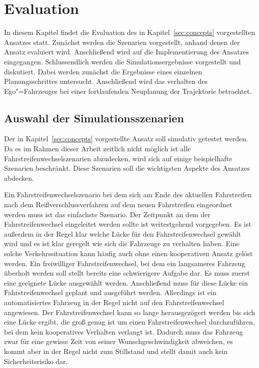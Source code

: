 
\chapter{Evaluation}
\label{sec:evaluation}
In diesem Kapitel findet die Evaluation des in Kapitel~\ref{sec:concepts} vorgestellten Ansatzes statt.
Zun\"achst werden die Szenarien vorgestellt, anhand denen der Ansatz evaluiert wird.
Anschlie{\ss}end wird auf die Implementierung des Ansatzes eingegangen.
Schlussendlich werden die Simulationsergebnisse vorgestellt und diskutiert. 
Dabei werden zun\"achst die Ergebnisse eines einzelnen Planungsschrittes untersucht.
Anschlie{\ss}end wird das verhalten des Ego"=Fahrzeuges bei einer fortlaufenden Neuplanung der Trajektorie betrachtet.


\section{Auswahl der Simulationsszenarien}
Der in Kapitel~\ref{sec:concepts} vorgestellte Ansatz soll simulativ getestet werden.
Da es im Rahmen dieser Arbeit zeitlich nicht m\"oglich ist alle Fahrstreifenwechselszenarien abzudecken, wird sich auf einige beispielhafte Szenarien beschr\"ankt.
Diese Szenarien soll die wichtigsten Aspekte des Ansatzes abdecken.

Ein Fahrstreifenwechselszenario bei dem sich am Ende des aktuellen Fahrstreifen nach dem Rei{\ss}verschlussverfahren auf dem neuen Fahrstreifen eingeordnet werden muss ist das einfachste Szenario.
Der Zeitpunkt an dem der Fahrstreifenwechsel eingeleitet werden sollte ist weitestgehend vorgegeben.
Es ist au{\ss}erdem in der Regel klar welche L\"ucke f\"ur den Fahrstreifenwechsel gew\"ahlt wird und es ist klar geregelt wie sich die Fahrzeuge zu verhalten haben.
Eine solche Verkehrssituation kann h\"aufig auch ohne einen kooperativen Ansatz gel\"ost werden. 
Ein freiwilliger Fahrstreifenwechsel, bei dem ein langsameres Fahrzeug \"uberholt werden soll stellt bereits eine schwierigere Aufgabe dar. 
Es muss zuerst eine geeignete L\"ucke ausgew\"ahlt werden.
Anschlie{\ss}end muss f\"ur diese L\"ucke ein Fahrstreifenwechsel geplant und ausgef\"uhrt werden.
Allerdings ist ein automatisiertes Fahrzeug in der Regel nicht auf den Fahrstreifenwechsel angewiesen.
Der Fahrstreifenwechsel kann so lange herausgez\"ogert werden bis sich eine L\"ucke ergibt, die gro{\ss} genug ist um einen Fahrstreifenwechsel durchzuf\"uhren, bei dem kein kooperatives Verhalten verlangt ist.
Dadurch muss das Fahrzeug zwar f\"ur eine gewisse Zeit von seiner Wunschgeschwindigkeit abweichen, es kommt aber in der Regel nicht zum Stillstand und stellt damit auch kein Sicherheitsrisiko dar.

